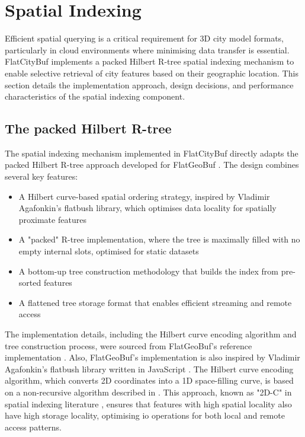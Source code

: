 
\section{Spatial Indexing}
\label{methodology:spatial_index}

Efficient spatial querying is a critical requirement for 3D city model formats, particularly in cloud environments where minimising data transfer is essential. FlatCityBuf implements a packed Hilbert R-tree spatial indexing mechanism \citep{Roussopoulos_Leifker_1985} to enable selective retrieval of city features based on their geographic location. This section details the implementation approach, design decisions, and performance characteristics of the spatial indexing component.

\subsection{The packed Hilbert R-tree}
\label{methodology:spatial_index:packed_hilbert_rtree}

The spatial indexing mechanism implemented in FlatCityBuf directly adapts the packed Hilbert R-tree approach developed for FlatGeoBuf \citep{horance_2022_detail}. The design combines several key features:

\begin{itemize}
  \item A Hilbert curve-based spatial ordering strategy, inspired by Vladimir Agafonkin's flatbush library, which optimises data locality for spatially proximate features
  \item A "packed" R-tree implementation, where the tree is maximally filled with no empty internal slots, optimised for static datasets
  \item A bottom-up tree construction methodology that builds the index from pre-sorted features
  \item A flattened tree storage format that enables efficient streaming and remote access
\end{itemize}

The implementation details, including the Hilbert curve encoding algorithm and tree construction process, were sourced from FlatGeoBuf's reference implementation \citep{flatgeobuf_github}. Also, FlatGeoBuf's implementation is also inspired by Vladimir Agafonkin's flatbush library written in JavaScript \citep{vladimir_2018}. The Hilbert curve encoding algorithm, which converts 2D coordinates into a 1D space-filling curve, is based on a non-recursive algorithm described in \citet{hacker_delight_2012}. This approach, known as "2D-C" in spatial indexing literature \citep{hacker_delight_2012}, ensures that features with high spatial locality also have high storage locality, optimising \ac{io} operations for both local and remote access patterns.

